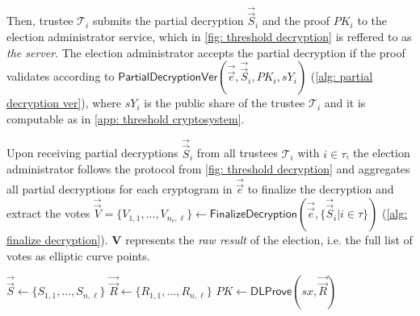 Then, trustee $\mathcal{T}_i$ submits the partial decryption $\vec{\vec{S}}_i$ and the proof $PK_i$ to the election administrator service, which in \cref{fig: threshold decryption} is reffered to as \textit{the server}. The election administrator accepts the partial decryption if the proof validates according to $\mathsf{PartialDecryptionVer}(\vec{\vec{e}}, \vec{\vec{S}}_i, PK_i, sY_i)$ (\cref{alg: partial decryption ver}), where $sY_i$ is the public share of the trustee $\mathcal{T}_i$ and it is computable as in \cref{app: threshold cryptosystem}.

Upon receiving partial decryptions $\vec{\vec{S}}_i$ from all trustees $\mathcal{T}_i$ with $i \in \tau$, the election administrator follows the protocol from \cref{fig: threshold decryption} and aggregates all partial decryptions for each cryptogram in $\vec{\vec{e}}$ to finalize the decryption and extract the votes $\vec{\vec{V}} = \{ V_{1, 1}, ..., V_{n_\mathrm{e}, \ell} \} \gets \mathsf{FinalizeDecryption} (\vec{\vec{e}}, \{ \vec{\vec{S}}_i | i \in \tau \})$ (\cref{alg: finalize decryption}). $\boldsymbol{V}$ represents the \textit{raw result} of the election, i.e. the full list of votes as elliptic curve points.

\begin{algorithm}[ht]
    \DontPrintSemicolon
    \caption{$\mathsf{PartiallyDecryptAndProve}(\vec{\vec{e}}, sx)$}
    \label{alg: partially decrypt and prove}
    
    $\vec{\vec{S}} \gets \{ S_{1, 1}, ..., S_{n, \ell} \}$ \;
    $\vec{\vec{R}} \gets \{ R_{1, 1}, ..., R_{n, \ell} \}$ \;
    $PK \gets \mathsf{DLProve}(sx, \vec{\vec{R}})$ 
     
\end{algorithm}

